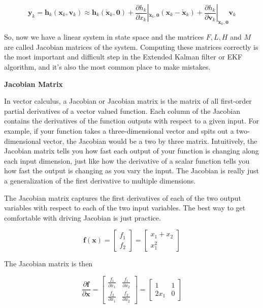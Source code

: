 \begin{equation}
\mathbf{y}_k = \mathbf{h}_k(\mathbf{x}_k, \mathbf{v}_k) \approx \mathbf{h}_k(\check{\mathbf{x}}_k, \mathbf{0}) + \frac{\partial h_k}{\partial x_k} |_{\check{\mathbf{x}}_{k}, \mathbf{0}} (\mathbf{x}_k-\check{\mathbf{x}}_k) + \frac{\partial h_k}{\partial \mathbf{v}_k} |_{\check{\mathbf{x}}_k, \mathbf{0}} \mathbf{v}_k
\end{equation}

 So, now we have a linear system in
state space and the matrices $F, L, H$ and $M$ are called Jacobian
matrices of the system. Computing these matrices correctly is the most important and difficult step in the Extended Kalman filter or EKF algorithm, and it's also the most common
place to make mistakes. 

\begin{framed}
\theoremstyle{remark}
\begin{remark}{\textbf{Jacobian Matrix}}

In vector calculus, a Jacobian or Jacobian matrix is the matrix of all
first-order partial derivatives of a vector valued function. Each column of the Jacobian
contains the derivatives of the function outputs with
respect to a given input. For example, if your function takes a three-dimensional vector and
spits out a two-dimensional vector, the Jacobian would be
a two by three matrix. Intuitively, the Jacobian matrix
tells you how fast each output of your function is changing
along each input dimension, just like how the derivative
of a scalar function tells you how fast the output is
changing as you vary the input. The Jacobian is really
just a generalization of the first derivative
to multiple dimensions. 

The Jacobian matrix captures
the first derivatives of each of the two output variables with respect
to each of the two input variables. The best way to get comfortable with
driving Jacobian is just practice. 

\begin{equation}
\mathbf{f}(\mathbf{x}) = 
\begin{bmatrix}
f_1 \\
f_2
\end{bmatrix} = 
\begin{bmatrix}
x_1 + x_2 \\
x_{1}^2
\end{bmatrix}
\end{equation}

The Jacobian matrix is then

\begin{equation}
\frac{\partial \mathbf{f}}{\partial \mathbf{x}} = 
\begin{bmatrix}
\frac{f_1}{\partial x_1} & \frac{f_1}{\partial x_2}  \\
\frac{f_2}{\partial x_1} & \frac{f_2}{\partial x_2}
\end{bmatrix} = 
\begin{bmatrix}
1 & 1 \\
2x_1 & 0 
\end{bmatrix}
\end{equation}


\end{remark}
\end{framed}

